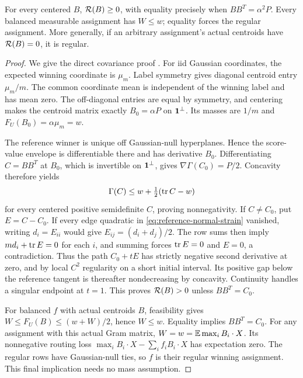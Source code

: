 \begin{proposition}\label{prop:endpoint}
For every centered $B$, $\mathcal R(B)\ge0$, with equality precisely when
$BB^T=\alpha^2P$. Every balanced measurable assignment has $W\le w$;
equality forces the regular assignment. More generally, if an arbitrary
assignment's actual centroids have $\mathcal R(B)=0$, it is regular.
\end{proposition}
\begin{proof}
We give the direct covariance proof \cite{endpoint}. For iid Gaussian
coordinates, the expected winning coordinate is $\mu_m$. Label symmetry
gives diagonal centroid entry $\mu_m/m$. The common coordinate mean is
independent of the winning label and has mean zero. The off-diagonal
entries are equal by symmetry, and centering makes the centroid matrix
exactly $B_0=\alpha P$ on $\mathbf 1^\perp$. Its masses are $1/m$ and
$F_U(B_0)=\alpha\mu_m=w$.

The reference winner is unique off Gaussian-null hyperplanes. Hence the
score-value envelope is differentiable there and has derivative $B_0$.
Differentiating $C=BB^T$ at $B_0$, which is invertible on $\mathbf 1^\perp$,
gives $\nabla\Gamma(C_0)=P/2$. Concavity therefore yields
\[
 \Gamma(C)\le w+\tfrac12(\operatorname{tr} C-w)
\]
for every centered positive semidefinite $C$, proving nonnegativity.
If $C\ne C_0$, put $E=C-C_0$. If every edge quadratic in
\eqref{eq:reference-normal-strain} vanished, writing $d_i=E_{ii}$
would give $E_{ij}=(d_i+d_j)/2$. The row sums then imply
$md_i+\operatorname{tr} E=0$ for each $i$, and summing forces $\operatorname{tr} E=0$ and $E=0$,
a contradiction. Thus the path $C_0+tE$ has strictly negative second
derivative at zero, and by local $C^2$ regularity on a short initial
interval. Its positive gap below the reference tangent is thereafter
nondecreasing by concavity. Continuity handles a singular endpoint at
$t=1$. This proves $\mathcal R(B)>0$ unless $BB^T=C_0$.

For balanced $f$ with actual centroids $B$, feasibility gives
$W\le F_U(B)\le(w+W)/2$, hence $W\le w$. Equality implies
$BB^T=C_0$. For any assignment with this actual Gram matrix,
$W=w=\mathbb E\max_i B_i\cdot X$. Its nonnegative routing loss
$\max_i B_i\cdot X-\sum_i f_i B_i\cdot X$ has expectation zero.
The regular rows have Gaussian-null ties, so $f$ is their regular
winning assignment. This final implication needs no mass assumption.
\end{proof}

